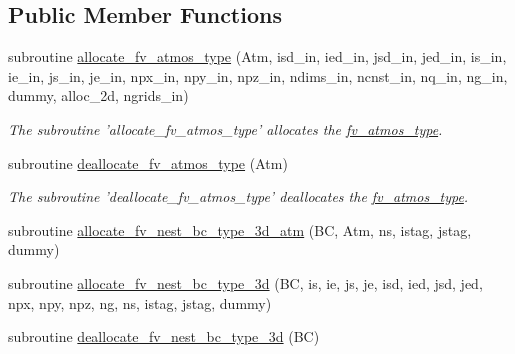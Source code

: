 \subsection*{Public Member Functions}
\begin{DoxyCompactItemize}
\item 
subroutine \hyperlink{classfv__arrays__mod_a6156c72def1af9adbf16f5c7d739b067}{allocate\-\_\-fv\-\_\-atmos\-\_\-type} (Atm, isd\-\_\-in, ied\-\_\-in, jsd\-\_\-in, jed\-\_\-in, is\-\_\-in, ie\-\_\-in, js\-\_\-in, je\-\_\-in, npx\-\_\-in, npy\-\_\-in, npz\-\_\-in, ndims\-\_\-in, ncnst\-\_\-in, nq\-\_\-in, ng\-\_\-in, dummy, alloc\-\_\-2d, ngrids\-\_\-in)
\begin{DoxyCompactList}\small\item\em The subroutine 'allocate\-\_\-fv\-\_\-atmos\-\_\-type' allocates the \hyperlink{structfv__arrays__mod_1_1fv__atmos__type}{fv\-\_\-atmos\-\_\-type}. \end{DoxyCompactList}\item 
subroutine \hyperlink{classfv__arrays__mod_a067591249b864319923ca6f7fbdc7cd3}{deallocate\-\_\-fv\-\_\-atmos\-\_\-type} (Atm)
\begin{DoxyCompactList}\small\item\em The subroutine 'deallocate\-\_\-fv\-\_\-atmos\-\_\-type' deallocates the \hyperlink{structfv__arrays__mod_1_1fv__atmos__type}{fv\-\_\-atmos\-\_\-type}. \end{DoxyCompactList}\item 
subroutine \hyperlink{classfv__arrays__mod_ae50208744b917974ac850d2073f834a1}{allocate\-\_\-fv\-\_\-nest\-\_\-bc\-\_\-type\-\_\-3d\-\_\-atm} (B\-C, Atm, ns, istag, jstag, dummy)
\item 
subroutine \hyperlink{classfv__arrays__mod_a098713dd7c958d62449b21e869c5472a}{allocate\-\_\-fv\-\_\-nest\-\_\-bc\-\_\-type\-\_\-3d} (B\-C, is, ie, js, je, isd, ied, jsd, jed, npx, npy, npz, ng, ns, istag, jstag, dummy)
\item 
subroutine \hyperlink{classfv__arrays__mod_a30884d6ec24da5922d899ee396e86020}{deallocate\-\_\-fv\-\_\-nest\-\_\-bc\-\_\-type\-\_\-3d} (B\-C)
\end{DoxyCompactItemize}
